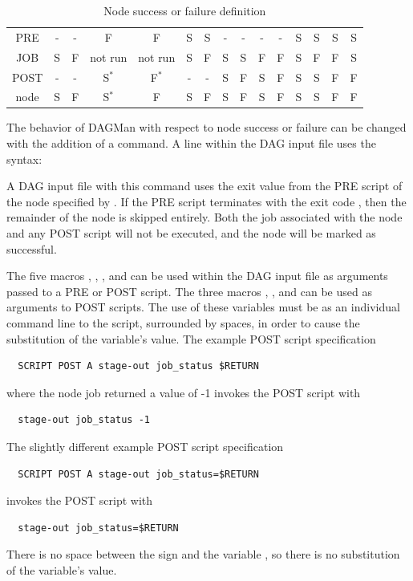 \begin{itemize}
\begin{center}
\begin{table}[hbt]
\begin{tabular}{|c||cccccccccccccc|} \hline
PRE   & - & - & F          & F          & S & S & - & - & - & - & S & S & S & S  \\
JOB   & S & F & not run    & not run    & S & F & S & S & F & F & S & F & F & S  \\
POST  & - & - & S${}^\ast$ & F${}^\ast$ & - & - & S & F & S & F & S & S & F & F  \\
\hline \hline
node  & S & F & S${}^\ast$ & F          & S & F & S & F & S & F & S & S & F & F  \\
\hline
\end{tabular}
\caption{\label{Node-success-failure}Node success or failure definition }
\end{table}
\end{center}

The behavior of DAGMan with respect to node success or failure can be changed 
with the addition of a  command. 
A  line within the DAG input file uses the syntax: 

  

A DAG input file with this command uses the exit value from the
PRE script of the node specified by . 
If the PRE script terminates with the exit code ,
then the remainder of the node is skipped entirely.  
Both the job associated with the node and
any POST script will not be executed,
and the node will be marked as successful.


The five macros , , , 
 and  can be used within the
DAG input file as arguments passed to a PRE or POST script. 
The three macros , , 
and  can
be used as arguments to POST scripts.
The use of these variables must be as an individual command
line  to the script,
surrounded by spaces, in order to cause the substitution of the
variable's value.
The example POST script specification
\begin{verbatim}
  SCRIPT POST A stage-out job_status $RETURN 
\end{verbatim}
where the node job returned a value of -1
invokes the POST script with
\begin{verbatim}
  stage-out job_status -1
\end{verbatim}
The slightly different example POST script specification
\begin{verbatim}
  SCRIPT POST A stage-out job_status=$RETURN 
\end{verbatim}
invokes the POST script with
\begin{verbatim}
  stage-out job_status=$RETURN
\end{verbatim}
There is no space between the \Expr{=} sign and the variable ,
so there is no substitution of the variable's value.


\end{itemize}
